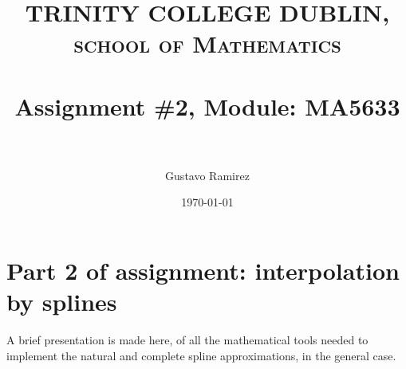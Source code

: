 \documentclass[paper=a4, fontsize=11pt]{scrartcl} %
\title{	
\normalfont \normalsize 
\textsc{TRINITY COLLEGE DUBLIN, school of Mathematics} \\ [25pt] %
\horrule{0.5pt} \\[0.4cm] %
\huge Assignment \#2, Module: MA5633 \\ %
\horrule{2pt} \\[0.5cm] %
}
\author{Gustavo Ramirez} %
\date{\normalsize\today} %
\numberwithin{equation}{section} %
\numberwithin{figure}{section} %
\numberwithin{table}{section} %
\begin{document}
\maketitle %


\section{Part 2 of assignment: interpolation by splines}

A brief presentation is made here, of all the mathematical tools needed to implement the natural and complete spline approximations, in the general case.

\begin{comment}
\begin{enumerate}
\item Write a C program that multiplies two matrices. The sizes of the matrices should again be given to the program as command line arguments and be filled with values from a random number generator.
\item Use the gettimeofday() function (or some other appropriate timing routine) to measure the time taken to calculate the matrix product for various sizes of matrices. Plot a graph of your timings using gnuplot and generate a PostScript file with the graph. What conclusions, if any, can you draw about the performance of your code.
\item Play around with various compiler options for optimizing the execution of your code. Compare the performance against the unoptimized (-O0) version timed in Task 2. Which combination of flags gives the best performance?
\item (bonus marks) Read about the BLAS library and see if you can modify your code to use this library to get better performance. You will want to look at the DGEMM function.
\end{enumerate}
\end{comment}

\newpage


\begin{comment}

USEFUL LINKS:

official sources for terminology:
-----
http://www.intel.com/content/www/us/en/support/topics/glossary.html
https://www-01.ibm.com/software/globalization/terminology/a.html
-----




about IMB processors:
-----

insert in google: list of ibm processors
https://en.wikipedia.org/wiki/List_of_IBM_products
https://www-01.ibm.com/software/passportadvantage/guide_to_identifying_processor_family.html
http://www.nextplatform.com/2015/08/10/ibm-roadmap-extends-power-chips-to-2020-and-beyond/
http://www.theverge.com/2015/7/9/8919091/ibm-7nm-transistor-processor
https://www.ibm.com/developerworks/ibmi/library/i-ibmi-7_2-and-ibm-power8/
-----

\end{comment}
\end{document}
